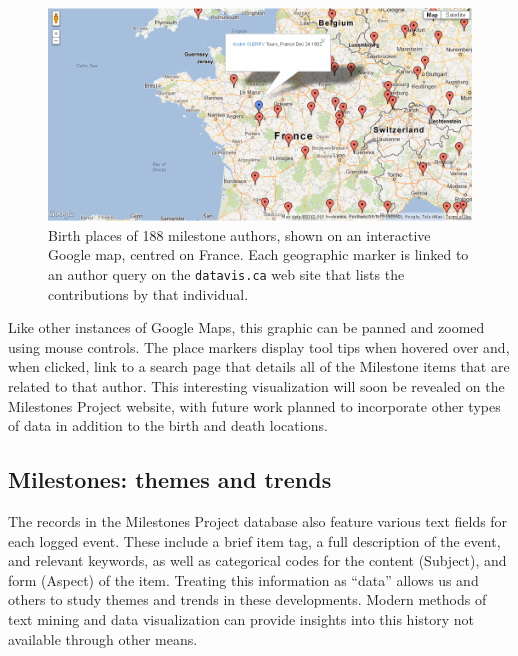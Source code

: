 \begin{figure}[!htb]
  \centering
  \includegraphics[width=\textwidth,clip]{fig/authormap}
  \caption{Birth places of 188 milestone authors, shown on an interactive Google map, centred on France. Each geographic marker is linked to an author query on the \texttt{datavis.ca} web site that lists the contributions by that individual.}
  \label{fig:authormap}
\end{figure}

Like other instances of Google Maps, this graphic can be panned and zoomed using mouse controls. The place markers display tool tips when hovered over and, when clicked, link to a search page that details all of the Milestone items that are related to that author. This interesting visualization will soon be revealed on the Milestones Project website, with future work planned to incorporate other types of data in addition to the birth and death locations.

\subsection{Milestones: themes and trends}\label{sec:themes}
The records in the Milestones Project database also feature various text fields for each logged event. These include a brief item tag, a full description of the event, and relevant keywords, as well as categorical codes for the content (Subject), and form  (Aspect) of the item. Treating this information as ``data'' allows us and others to study themes and trends in these developments.  Modern methods of text mining and data visualization can provide insights into this history not available through other means.

